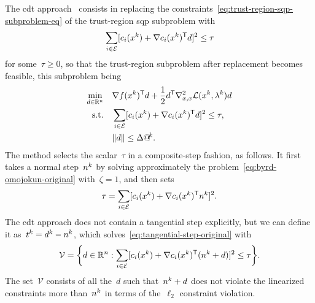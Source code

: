 The \gls{cdt} approach~\cite{Celis_1985,Celis_Dennis_Tapia_1985} consists in replacing the constraints~\cref{eq:trust-region-sqp-subproblem-eq} of the trust-region \gls{sqp} subproblem with
\begin{equation*}
    \sum_{i \in \ieq} [\con{i}(\iter[k]) + \nabla \con{i}(\iter[k])^{\T} \step]^2 \le \tau
\end{equation*}
for some~$\tau \ge 0$, so that the trust-region subproblem after replacement becomes feasible, this subproblem being
\begin{subequations}
    \label{eq:cdt-composite-step-original}
    \begin{align}
        \min_{\step \in \R^n}   & \quad \nabla \obj(\iter[k])^{\T} \step + \frac{1}{2} \step^{\T} \nabla_{x, x}^2 \lag(\iter[k], \lm[k]) \step\\
        \text{s.t.}             & \quad \sum_{i \in \ieq} [\con{i}(\iter[k]) + \nabla \con{i}(\iter[k])^{\T} \step]^2 \le \tau, \label{eq:cdt-composite-step-original-eq}\\
                                & \quad \norm{\step} \le \rad[k]. \label{eq:cdt-composite-step-original-tr}
    \end{align}
\end{subequations}
The method selects the scalar~$\tau$ in a composite-step fashion, as follows.
It first takes a normal step~$\nstep[k]$ by solving approximately the problem~\cref{eq:byrd-omojokun-original} with~$\zeta = 1$, and then sets
\begin{equation*}
    \tau = \sum_{i \in \ieq} [\con{i}(\iter[k]) + \nabla \con{i}(\iter[k])^{\T} \nstep[k]]^2.
\end{equation*}
The \gls{cdt} approach does not contain a tangential step explicitly, but we can define it as~$\tstep[k] = \step[k] - \nstep[k]$, which solves~\cref{eq:tangential-step-original} with
\begin{equation*}
    \mathcal{V} = \set[\bigg]{d \in \R^n : \sum_{i \in \ieq} [\con{i}(\iter[k]) + \nabla \con{i}(\iter[k])^{\T} (\nstep[k] + \step)]^2 \le \tau}.
\end{equation*}
The set~$\mathcal{V}$ consists of all the~$d$ such that~$\nstep[k] + d$ does not violate the linearized constraints more than~$\nstep[k]$ in terms of the~$\ell_2$ constraint violation.

